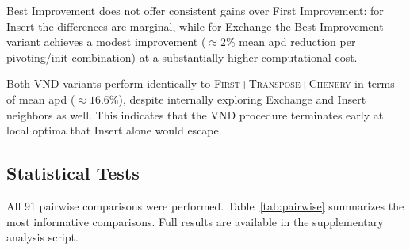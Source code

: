 \documentclass[11pt,a4paper]{article}
\begin{document}
Best Improvement does not offer consistent gains over First Improvement:
for Insert the differences are marginal, while for Exchange the
Best Improvement variant achieves a modest improvement ($\approx 2\%$
mean apd reduction per pivoting/init combination) at a substantially
higher computational cost.

Both VND variants perform identically to
\textsc{First}+\textsc{Transpose}+\textsc{Chenery} in terms of mean
apd ($\approx 16.6\%$), despite internally exploring Exchange and Insert
neighbors as well.  This indicates that the VND procedure terminates
early at local optima that Insert alone would escape.

\subsection{Statistical Tests}

All 91 pairwise comparisons were performed.
Table~\ref{tab:pairwise} summarizes the most informative comparisons.
Full results are available in the supplementary analysis script.
\end{document}
